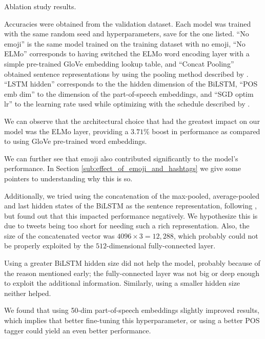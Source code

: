 \documentclass[11pt,a4paper]{article}
\begin{document}
\begin{table}[!h]
    \caption{Ablation study results.}
    \vspace{-0.4cm}
    \caption*{
        \footnotesize Accuracies were obtained from the
        validation dataset. Each model was trained with the same random seed and
        hyperparameters, save for the one listed. ``No emoji'' is the same model
        trained on the training dataset with no emoji, ``No ELMo'' corresponds
        to having switched the ELMo word encoding layer with a simple
        pre-trained GloVe embedding lookup table, and ``Concat Pooling''
        obtained sentence representations by using the pooling method described
        by \citet{howard2018universal}. ``LSTM hidden'' corresponds to the the
        hidden dimension of the BiLSTM, ``POS emb dim'' to the dimension of the
        part-of-speech embeddings, and ``SGD optim lr'' to the learning rate
        used while optimizing with the schedule described by \citet{conneau2017supervised}.}

    \label{table:ablation}

\end{table}



We can observe that the architectural choice that had the greatest impact on our model was the ELMo layer, providing a $3.71\%$ boost in performance as compared to using GloVe pre-trained word embeddings.

We can further see that emoji also contributed significantly to the model's performance. In Section \ref{sub:effect_of_emoji_and_hashtags} we give some pointers to understanding why this is so.  

Additionally, we tried using the concatenation of the max-pooled, average-pooled and last hidden states of the BiLSTM as the sentence representation, following \citet{howard2018universal}, but found out that this impacted performance negatively. We hypothesize this is due to tweets being too short for needing such a rich representation. Also, the size of the concatenated vector was $4096\times3=12,288$, which probably could not be properly exploited by the $512$-dimensional fully-connected layer.

Using a greater BiLSTM hidden size did not help the model, probably because of the reason mentioned early; the fully-connected layer was not big or deep enough to exploit the additional information. Similarly, using a smaller hidden size neither helped.

We found that using 50-dim part-of-speech embeddings slightly improved results, which implies that better fine-tuning this hyperparameter, or using a better POS tagger could yield an even better performance.
\end{document}

